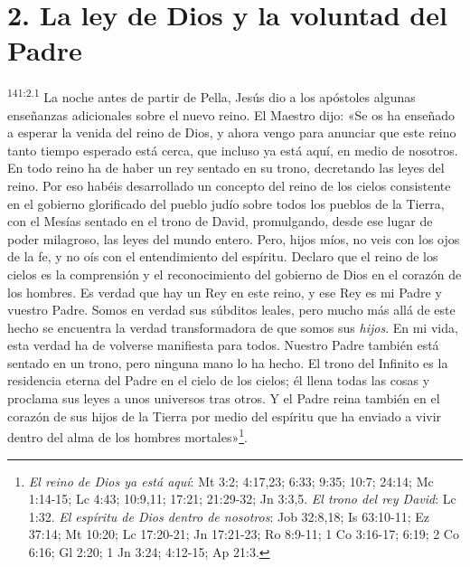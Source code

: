 \section*{2. La ley de Dios y la voluntad del Padre}
\par
\textsuperscript{141:2.1} La noche antes de partir de Pella, Jesús dio a los apóstoles algunas enseñanzas adicionales sobre el nuevo reino. El Maestro dijo: «Se os ha enseñado a esperar la venida del reino de Dios, y ahora vengo para anunciar que este reino tanto tiempo esperado está cerca, que incluso ya está aquí, en medio de nosotros. En todo reino ha de haber un rey sentado en su trono, decretando las leyes del reino. Por eso habéis desarrollado un concepto del reino de los cielos consistente en el gobierno glorificado del pueblo judío sobre todos los pueblos de la Tierra, con el Mesías sentado en el trono de David, promulgando, desde ese lugar de poder milagroso, las leyes del mundo entero. Pero, hijos míos, no veis con los ojos de la fe, y no oís con el entendimiento del espíritu. Declaro que el reino de los cielos es la comprensión y el reconocimiento del gobierno de Dios en el corazón de los hombres. Es verdad que hay un Rey en este reino, y ese Rey es mi Padre y vuestro Padre. Somos en verdad sus súbditos leales, pero mucho más allá de este hecho se encuentra la verdad transformadora de que somos sus \textit{hijos}. En mi vida, esta verdad ha de volverse manifiesta para todos. Nuestro Padre también está sentado en un trono, pero ninguna mano lo ha hecho. El trono del Infinito es la residencia eterna del Padre en el cielo de los cielos; él llena todas las cosas y proclama sus leyes a unos universos tras otros. Y el Padre reina también en el corazón de sus hijos de la Tierra por medio del espíritu que ha enviado a vivir dentro del alma de los hombres mortales»\footnote{\textit{El reino de Dios ya está aquí}: Mt 3:2; 4:17,23; 6:33; 9:35; 10:7; 24:14; Mc 1:14-15; Lc 4:43; 10:9,11; 17:21; 21:29-32; Jn 3:3,5. \textit{El trono del rey David}: Lc 1:32. \textit{El espíritu de Dios dentro de nosotros}: Job 32:8,18; Is 63:10-11; Ez 37:14; Mt 10:20; Lc 17:20-21; Jn 17:21-23; Ro 8:9-11; 1 Co 3:16-17; 6:19; 2 Co 6:16; Gl 2:20; 1 Jn 3:24; 4:12-15; Ap 21:3.}.

